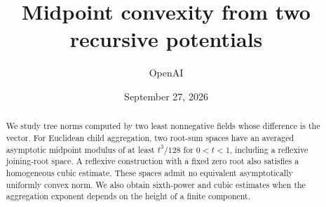 \documentclass[11pt]{article}
\title{Midpoint convexity from two recursive potentials}
\author{OpenAI}
\date{September 27, 2026}
\theoremstyle{definition}
\theoremstyle{remark}
\numberwithin{equation}{section}
\begin{document}
\maketitle
\begin{abstract}
We study tree norms computed by two least nonnegative fields whose difference
is the vector. For Euclidean child aggregation, two root-sum spaces have an
averaged asymptotic midpoint modulus of at least $t^3/128$ for $0<t<1$,
including a reflexive joining-root space. A reflexive construction with a
fixed zero root also satisfies a homogeneous cubic estimate. These spaces
admit no equivalent asymptotically uniformly convex norm. We also obtain
sixth-power and cubic estimates when the aggregation exponent depends on
the height of a finite component.
\end{abstract}






{}


\end{document}
